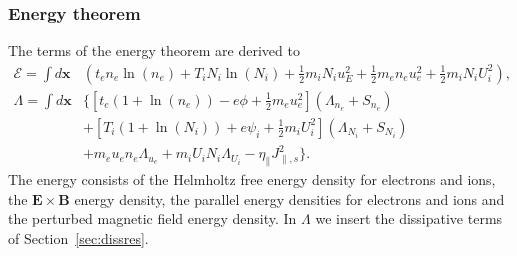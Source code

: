 \documentclass{hitec} %
\renewcommand{\vec}[1]{\boldsymbol{#1}}
\begin{document}
\subsubsection{Energy theorem}
The terms of the energy theorem are derived to
\begin{align}
  \mathcal{E}= \int  d\vec{x} & \left( t_e n_e \ln{(n_e)} +T_i N_i\ln{(N_i)}+  \frac{1}{2} m_i N_i u_E^2 +\frac{1}{2} m_e  n_e u_e^2 +\frac{1}{2} m_i  N_i U_i^2  \right),\\
  \Lambda =  \int d\vec{x} & \bigg\{  \left[t_e\left( 1+\ln{(n_e)}\right) -e \phi + \frac{1}{2} m_e u_e^2 \right](\Lambda_{n_e} + S_{n_e})
  \nonumber\\ &
+\left[T_i\left( 1+\ln{(N_i)}\right) +e \psi_i + \frac{1}{2} m_i U_i^2 \right](\Lambda_{N_i}+S_{N_i})
\nonumber \\ &
+ m_e u_e n_e \Lambda_{u_e}+m_iU_i N_i \Lambda_{U_i} - \eta_\parallel J_{\parallel,s}^2\bigg\}.
\end{align}
The energy consists of the Helmholtz free energy density for electrons and ions, the \(\vec{E} \times \vec{B}\) energy density, the parallel energy densities for electrons and ions and the perturbed magnetic field energy density.
In \(\Lambda\) we insert the dissipative terms of Section~\ref{sec:dissres}. \\
\end{document}
